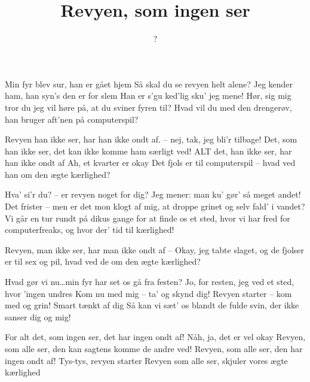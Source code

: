 \documentclass[a4paper,11pt]{article}
\title{Revyen, som ingen ser}
\author{?}
\begin{document}
\maketitle

\begin{song}
Min fyr blev sur, han er gået hjem
Så skal du se revyen helt alene?
Jeg kender ham, han syn's den er for slem
Han er s'gu ked'lig sku' jeg mene!
Hør, sig mig tror du jeg vil høre på, at du sviner fyren til?
Hvad vil du med den drengerøv, han bruger aft'nen på computerspil?

\bigskip

Revyen han ikke ser, har han ikke ondt af.
-- nej, tak, jeg bli'r tilbage!
Det, som han ikke ser, det kan ikke komme ham særligt ved!
ALT det, han ikke ser, har han ikke ondt af
Ah, et kvarter er okay
Det fjols er til computerspil -- hvad ved han om den ægte kærlighed?

\bigskip

Hva' si'r du? -- er revyen noget for dig?
Jeg mener: man ku' gør' så meget andet!
Det frister -- men er det mon klogt af mig,
at droppe grinet og selv fald' i vandet?
Vi går en tur rundt på {\sc diku}s gange for at finde os et sted,
hvor vi har fred for computerfreaks, og hvor der' tid til kærlighed!

\bigskip

Revyen, man ikke ser, har man ikke ondt af
-- Okay, jeg tabte slaget, og de fjolser er til sex og pil, hvad ved
de om den ægte kærlighed?

\bigskip

Hvad gør vi nu\dots min fyr har set os gå fra festen?
Jo, for resten,
jeg ved et sted, hvor 'ingen undres
Kom nu med mig -- ta' og skynd dig!
Revyen starter -- kom med og grin!
Smart tænkt af dig
Så kan vi sæt' os blandt de fulde svin, der ikke sanser dig og mig!

\bigskip

For alt det, som ingen ser, det har ingen ondt af!
Nåh, ja, det er vel okay
Revyen, som alle ser, den kan sagtens komme de andre ved!
Revyen, som alle ser, den har ingen ondt af!
Tys-tys, revyen starter
Revyen som alle ser, skjuler vores ægte kærlighed

\end{song}
\end{document}
